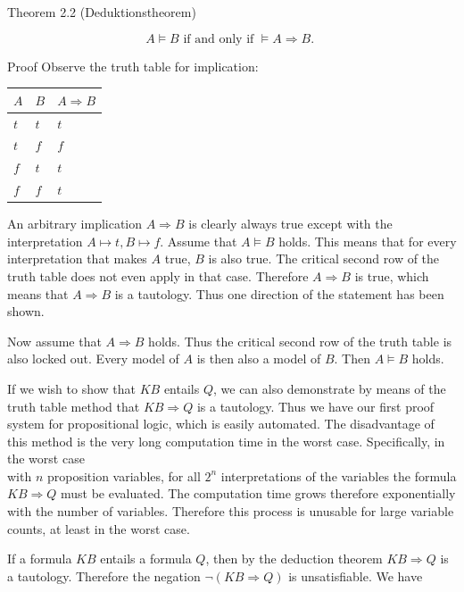 \documentclass[10pt]{book}
\begin{document}
Theorem 2.2 (Deduktionstheorem)

$$
A \models B \text { if and only if } \models A \Rightarrow B \text {. }
$$

Proof Observe the truth table for implication:

\begin{center}
\begin{tabular}{lll}
\hline
$A$ & $B$ & $A \Rightarrow B$ \\
\hline
$t$ & $t$ & $t$ \\
\hline
$t$ & $f$ & $f$ \\
\hline
$f$ & $t$ & $t$ \\
\hline
$f$ & $f$ & $t$ \\
\hline
\end{tabular}
\end{center}

An arbitrary implication $A \Rightarrow B$ is clearly always true except with the interpretation $A \longmapsto t, B \longmapsto f$. Assume that $A \models B$ holds. This means that for every interpretation that makes $A$ true, $B$ is also true. The critical second row of the truth table does not even apply in that case. Therefore $A \Rightarrow B$ is true, which means that $A \Rightarrow B$ is a tautology. Thus one direction of the statement has been shown.

Now assume that $A \Rightarrow B$ holds. Thus the critical second row of the truth table is also locked out. Every model of $A$ is then also a model of $B$. Then $A \models B$ holds.

If we wish to show that $K B$ entails $Q$, we can also demonstrate by means of the truth table method that $K B \Rightarrow Q$ is a tautology. Thus we have our first proof system for propositional logic, which is easily automated. The disadvantage of this method is the very long computation time in the worst case. Specifically, in the worst case\\
with $n$ proposition variables, for all $2^{n}$ interpretations of the variables the formula $K B \Rightarrow Q$ must be evaluated. The computation time grows therefore exponentially with the number of variables. Therefore this process is unusable for large variable counts, at least in the worst case.


If a formula $K B$ entails a formula $Q$, then by the deduction theorem $K B \Rightarrow Q$ is a tautology. Therefore the negation $\neg(K B \Rightarrow Q)$ is unsatisfiable. We have
\end{document}
